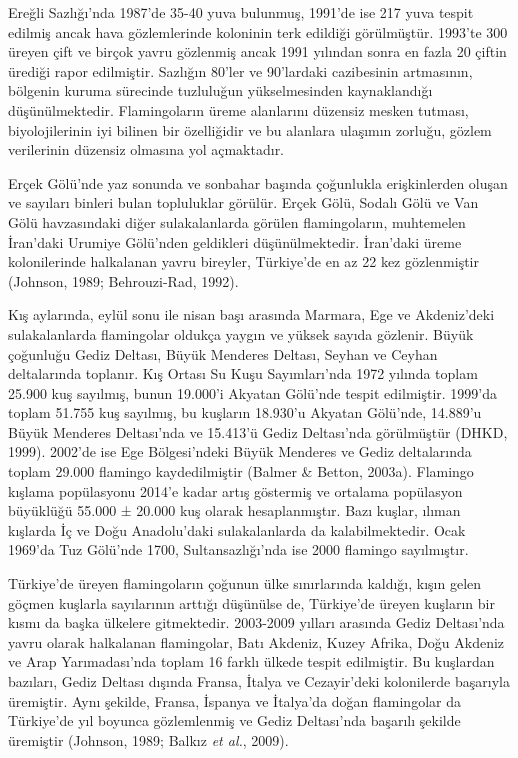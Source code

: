 \documentclass[
  a4paper,
  DIV=11,
  numbers=noendperiod]{scrreprt}
\begin{document}
Ereğli Sazlığı'nda 1987'de 35-40 yuva bulunmuş, 1991'de ise 217 yuva
tespit edilmiş ancak hava gözlemlerinde koloninin terk edildiği
görülmüştür. 1993'te 300 üreyen çift ve birçok yavru gözlenmiş ancak
1991 yılından sonra en fazla 20 çiftin ürediği rapor edilmiştir.
Sazlığın 80'ler ve 90'lardaki cazibesinin artmasının, bölgenin kuruma
sürecinde tuzluluğun yükselmesinden kaynaklandığı düşünülmektedir.
Flamingoların üreme alanlarını düzensiz mesken tutması, biyolojilerinin
iyi bilinen bir özelliğidir ve bu alanlara ulaşımın zorluğu, gözlem
verilerinin düzensiz olmasına yol açmaktadır.

Erçek Gölü'nde yaz sonunda ve sonbahar başında çoğunlukla erişkinlerden
oluşan ve sayıları binleri bulan topluluklar görülür. Erçek Gölü, Sodalı
Gölü ve Van Gölü havzasındaki diğer sulakalanlarda görülen
flamingoların, muhtemelen İran'daki Urumiye Gölü'nden geldikleri
düşünülmektedir. İran'daki üreme kolonilerinde halkalanan yavru
bireyler, Türkiye'de en az 22 kez gözlenmiştir (Johnson, 1989;
Behrouzi-Rad, 1992).

Kış aylarında, eylül sonu ile nisan başı arasında Marmara, Ege ve
Akdeniz'deki sulakalanlarda flamingolar oldukça yaygın ve yüksek sayıda
gözlenir. Büyük çoğunluğu Gediz Deltası, Büyük Menderes Deltası, Seyhan
ve Ceyhan deltalarında toplanır. Kış Ortası Su Kuşu Sayımları'nda 1972
yılında toplam 25.900 kuş sayılmış, bunun 19.000'i Akyatan Gölü'nde
tespit edilmiştir. 1999'da toplam 51.755 kuş sayılmış, bu kuşların
18.930'u Akyatan Gölü'nde, 14.889'u Büyük Menderes Deltası'nda ve
15.413'ü Gediz Deltası'nda görülmüştür (DHKD, 1999). 2002'de ise Ege
Bölgesi'ndeki Büyük Menderes ve Gediz deltalarında toplam 29.000
flamingo kaydedilmiştir (Balmer \& Betton, 2003a). Flamingo kışlama
popülasyonu 2014'e kadar artış göstermiş ve ortalama popülasyon
büyüklüğü 55.000 ± 20.000 kuş olarak hesaplanmıştır. Bazı kuşlar, ılıman
kışlarda İç ve Doğu Anadolu'daki sulakalanlarda da kalabilmektedir. Ocak
1969'da Tuz Gölü'nde 1700, Sultansazlığı'nda ise 2000 flamingo
sayılmıştır.

Türkiye'de üreyen flamingoların çoğunun ülke sınırlarında kaldığı, kışın
gelen göçmen kuşlarla sayılarının arttığı düşünülse de, Türkiye'de
üreyen kuşların bir kısmı da başka ülkelere gitmektedir. 2003-2009
yılları arasında Gediz Deltası'nda yavru olarak halkalanan flamingolar,
Batı Akdeniz, Kuzey Afrika, Doğu Akdeniz ve Arap Yarımadası'nda toplam
16 farklı ülkede tespit edilmiştir. Bu kuşlardan bazıları, Gediz Deltası
dışında Fransa, İtalya ve Cezayir'deki kolonilerde başarıyla üremiştir.
Aynı şekilde, Fransa, İspanya ve İtalya'da doğan flamingolar da
Türkiye'de yıl boyunca gözlemlenmiş ve Gediz Deltası'nda başarılı
şekilde üremiştir (Johnson, 1989; Balkız \emph{et al.}, 2009).
\end{document}
